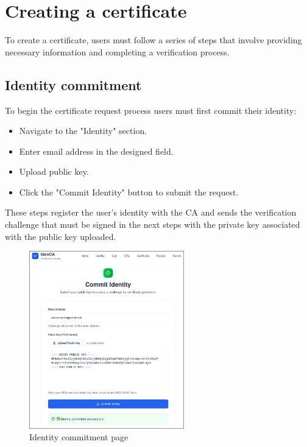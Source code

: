 \section{Creating a certificate}
To create a certificate, users must follow a series of steps that involve providing necessary 
information and completing a verification process. 
\subsection{Identity commitment}
To begin the certificate request process users must first commit their identity:
\begin{itemize}
    \item Navigate to the "Identity" section.
    \item Enter email address in the designed field.
    \item Upload public key.
    \item Click the "Commit Identity" button to submit the request.
\end{itemize}
These steps register the user's identity with the CA and sends the verification challenge that must 
be signed in the next steps with the private key associated with the public key uploaded.
\begin{figure}[h!]
    \centering
    \includegraphics[keepaspectratio, width=0.6\textwidth]{Pic/2_identity_committed.png}
    \caption{Identity commitment page}
    \label{fig:identity-commitment}
\end{figure}

